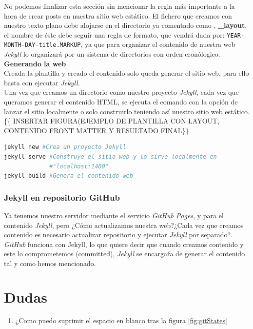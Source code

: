 \documentclass[a4paper, 12pt]{book}
\begin{document}
No podemos finalizar esta sección sin mencionar la regla más importante a la hora de crear posts en nuestra sitio web estático. El fichero que creamos con nuestro texto plano debe alojarse en el directorio ya comentado como , \textbf{\_layout}, el nombre de éste debe seguir una regla de formato, que vendrá dada por: \texttt{YEAR-MONTH-DAY-title.MARKUP}, ya que para organizar el contenido de nuestra web \emph{Jekyll} lo organizará por un sistema de directorios con orden cronólogico.  \\
\textbf{\large{Generando la web}}\\
Creada la plantilla y creado el contenido solo queda generar el sitio web, para ello basta con ejecutar \emph{Jekyll}.\\
Una vez que creamos un directorio como nuestro proyecto \emph{Jekyll}, cada vez que queramos generar el contenido HTML, se ejecuta el comando con la opción de lanzar el sitio localmente o solo construirlo teniendo así nuestro sitio web estático. \{\{ INSERTAR FIGURA(EJEMPLO DE PLANTILLA CON LAYOUT, CONTENIDO FRONT MATTER Y RESULTADO FINAL\}\}\\
\begin{lstlisting}[language=sh]
jekyll new #Crea un proyecto Jekyll
jekyll serve #Construye el sitio web y lo sirve localmente en     
             #"localhost:1400"
jekyll build #Genera el contenido web
\end{lstlisting}
\subsection{Jekyll en repositorio GitHub}
\label{subsec:jekandGit}
Ya tenemos nuestro servidor mediante el servicio \emph{GitHub Pages}, y para el contenido \emph{Jekyll}, pero ¿Cómo actualizamos nuestra web?¿Cada vez que creamos contenido es necesario actualizar repositorio y ejecutar \emph{Jekyll} por separado?. \\
\emph{GitHub} funciona con Jekyll, lo que quiere decir que cuando creamos contenido y este lo comprometemos (committed), \emph{Jekyll} se encargaŕa de generar el contenido tal y como hemos mencionado.

\chapter*{Dudas}
\begin{enumerate}
    \item ¿Como puedo suprimir el espacio en blanco tras la figura \ref{fig:gitStates}
\end{enumerate}
\end{document}
